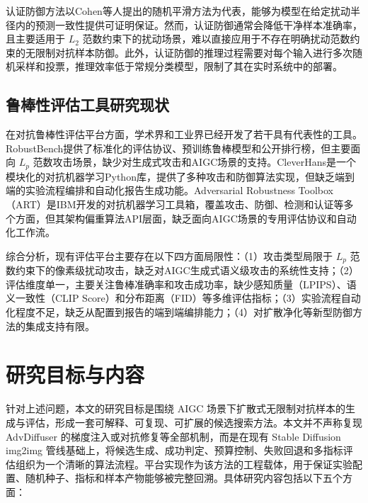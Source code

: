 \documentclass[type=bachelor,oneside]{fduthesis}
\begin{document}
认证防御方法以Cohen等人\cite{cohen2019certified}提出的随机平滑方法为代表，能够为模型在给定扰动半径内的预测一致性提供可证明保证。然而，认证防御通常会降低干净样本准确率，且主要适用于 $L_2$ 范数约束下的扰动场景，难以直接应用于不存在明确扰动范数约束的无限制对抗样本防御。此外，认证防御的推理过程需要对每个输入进行多次随机采样和投票，推理效率低于常规分类模型，限制了其在实时系统中的部署。

\subsection{鲁棒性评估工具研究现状}

在对抗鲁棒性评估平台方面，学术界和工业界已经开发了若干具有代表性的工具。RobustBench\cite{croce2021robustbench}提供了标准化的评估协议、预训练鲁棒模型和公开排行榜，但主要面向 $L_p$ 范数攻击场景，缺少对生成式攻击和AIGC场景的支持。CleverHans\cite{papernot2018cleverhans}是一个模块化的对抗机器学习Python库，提供了多种攻击和防御算法实现，但缺乏端到端的实验流程编排和自动化报告生成功能。Adversarial Robustness Toolbox（ART）\cite{nicolae2018adversarial}是IBM开发的对抗机器学习工具箱，覆盖攻击、防御、检测和认证等多个方面，但其架构偏重算法API层面，缺乏面向AIGC场景的专用评估协议和自动化工作流。

综合分析，现有评估平台主要存在以下四方面局限性：（1）攻击类型局限于 $L_p$ 范数约束下的像素级扰动攻击，缺乏对AIGC生成式语义级攻击的系统性支持；（2）评估维度单一，主要关注鲁棒准确率和攻击成功率，缺少感知质量（LPIPS）、语义一致性（CLIP Score）和分布距离（FID）等多维评估指标；（3）实验流程自动化程度不足，缺乏从配置到报告的端到端编排能力；（4）对扩散净化等新型防御方法的集成支持有限。

\section{研究目标与内容}

针对上述问题，本文的研究目标是围绕 AIGC 场景下扩散式无限制对抗样本的生成与评估，形成一套可解释、可复现、可扩展的候选搜索方法。本文并不声称复现 AdvDiffuser 的梯度注入或对抗修复等全部机制，而是在现有 Stable Diffusion img2img 管线基础上，将候选生成、成功判定、预算控制、失败回退和多指标评估组织为一个清晰的算法流程。平台实现作为该方法的工程载体，用于保证实验配置、随机种子、指标和样本产物能够被完整回溯。具体研究内容包括以下五个方面：
\end{document}
